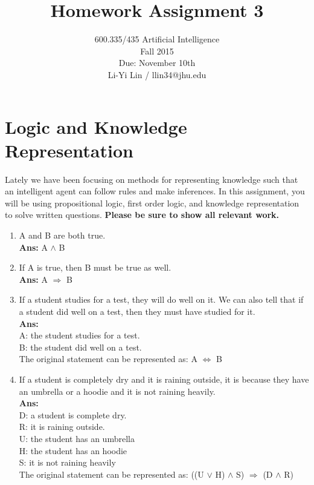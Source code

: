 \documentclass[12pt]{article}
\title{\vspace{-2cm} \bf Homework Assignment 3}
\author{600.335/435 Artificial Intelligence\\ 
Fall 2015\\ 
Due: November 10th\\ 
Li-Yi Lin / llin34@jhu.edu}
\date{}
\begin{document}
\maketitle

\section*{Logic and Knowledge Representation}

Lately we have been focusing on methods for representing knowledge such that an intelligent agent can follow rules and make inferences. In this assignment, you will be using propositional logic, first order logic, and knowledge representation to solve written questions. \textbf{Please be sure to show all relevant work.}

\begin{enumerate}

\subsection*{Translate the following english sentences into \emph{propositional logic}}

\item{A and B are both true.}\\
\textbf{Ans:} A $\wedge$ B

\item{If A is true, then B must be true as well.}\\
\textbf{Ans:} A $\Rightarrow$ B

\item{If a student studies for a test, they will do well on it. We can also tell that if a student did well on a test, then they must have studied for it.}\\
\textbf{Ans:}\\
A: the student studies for a test.\\
B: the student did well on a test.\\
The original statement can be represented as: A $\iff$ B

\item{If a student is completely dry and it is raining outside, it is because they have an umbrella or a hoodie and it is not raining heavily.}\\
\textbf{Ans:}\\
D: a student is complete dry.\\
R: it is raining outside.\\
U: the student has an umbrella\\
H: the student has an hoodie\\
S: it is not raining heavily\\
The original statement can be represented as: ((U $\vee$ H) $\wedge$ S) $\Rightarrow$ (D $\wedge$ R)


\end{enumerate}
\end{document}
